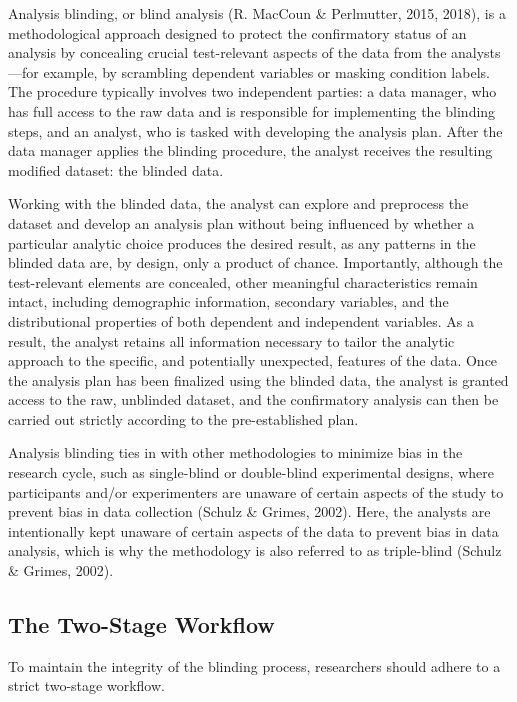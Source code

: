 \documentclass[
  english,
  man,floatsintext]{apa6}
\begin{document}
Analysis blinding, or blind analysis (R. MacCoun \& Perlmutter, 2015, 2018), is a methodological approach designed to protect the confirmatory status of an analysis by concealing crucial test-relevant aspects of the data from the analysts---for example, by scrambling dependent variables or masking condition labels. The procedure typically involves two independent parties: a data manager, who has full access to the raw data and is responsible for implementing the blinding steps, and an analyst, who is tasked with developing the analysis plan. After the data manager applies the blinding procedure, the analyst receives the resulting modified dataset: the blinded data.

Working with the blinded data, the analyst can explore and preprocess the dataset and develop an analysis plan without being influenced by whether a particular analytic choice produces the desired result, as any patterns in the blinded data are, by design, only a product of chance. Importantly, although the test-relevant elements are concealed, other meaningful characteristics remain intact, including demographic information, secondary variables, and the distributional properties of both dependent and independent variables. As a result, the analyst retains all information necessary to tailor the analytic approach to the specific, and potentially unexpected, features of the data. Once the analysis plan has been finalized using the blinded data, the analyst is granted access to the raw, unblinded dataset, and the confirmatory analysis can then be carried out strictly according to the pre-established plan.

Analysis blinding ties in with other methodologies to minimize bias in the research cycle, such as single-blind or double-blind experimental designs, where participants and/or experimenters are unaware of certain aspects of the study to prevent bias in data collection (Schulz \& Grimes, 2002). Here, the analysts are intentionally kept unaware of certain aspects of the data to prevent bias in data analysis, which is why the methodology is also referred to as triple-blind (Schulz \& Grimes, 2002).

\subsection{The Two-Stage Workflow}\label{the-two-stage-workflow}

To maintain the integrity of the blinding process, researchers should adhere to a strict two-stage workflow.
\end{document}
